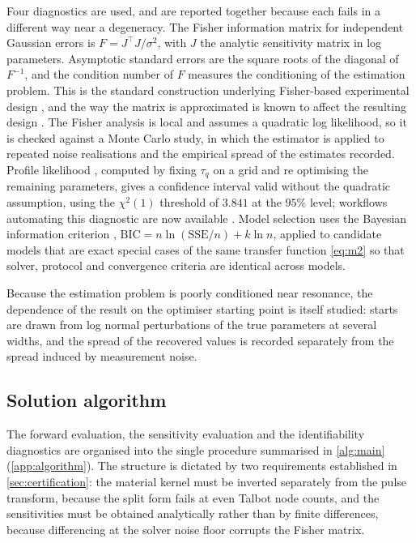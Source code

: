 \documentclass[preprint,12pt,a4paper]{elsarticle}
\theoremstyle{plain}
\theoremstyle{definition}
\theoremstyle{remark}
\newcommand{\tq}{\tau_{q}}
\begin{document}
Four diagnostics are used, and are reported together because each fails in a
different way near a degeneracy.
The Fisher information matrix for independent Gaussian errors is
$F = J^{\!\top}J/\sigma^{2}$, with $J$ the analytic sensitivity matrix in log
parameters. Asymptotic standard errors are the square roots of the diagonal of
$F^{-1}$, and the condition number of $F$ measures the conditioning of the
estimation problem. This is the standard construction underlying
Fisher-based experimental design \cite{Neilsen2018,Chhajer2024,Liu2026}, and the
way the matrix is approximated is known to affect the resulting design
\cite{Stromberg2016}. The Fisher analysis is local and assumes a quadratic
log likelihood, so it is checked against a Monte Carlo study, in which the
estimator is applied to repeated noise realisations and the empirical spread of
the estimates recorded. Profile likelihood \cite{Raue2009,Simpson2023}, computed by fixing $\tq$ on a
grid and re optimising the remaining parameters, gives a confidence interval
valid without the quadratic assumption, using the $\chi^{2}(1)$ threshold of
$3.841$ at the $95\%$ level; workflows automating this diagnostic are now
available \cite{Borisov2026,Simpson2026}. Model selection uses the Bayesian information criterion
\cite{Weakliem1999},
$\mathrm{BIC} = n\ln(\mathrm{SSE}/n) + k \ln n$, applied to candidate models
that are exact special cases of the same transfer function
\eqref{eq:m2} so that solver, protocol and convergence criteria are identical
across models.

Because the estimation problem is poorly conditioned near resonance, the
dependence of the result on the optimiser starting point is itself studied:
starts are drawn from log normal perturbations of the true parameters at
several widths, and the spread of the recovered values is recorded separately
from the spread induced by measurement noise.

\subsection{Solution algorithm}
\label{sec:methods-algorithm}

The forward evaluation, the sensitivity evaluation and the identifiability
diagnostics are organised into the single procedure summarised in
\cref{alg:main} (\ref{app:algorithm}). The structure is dictated by two
requirements established in \cref{sec:certification}: the material kernel
must be inverted separately from the pulse transform, because the split
form fails at even Talbot node counts, and the sensitivities must be
obtained analytically rather than by finite differences, because
differencing at the solver noise floor corrupts the Fisher matrix.
\end{document}
